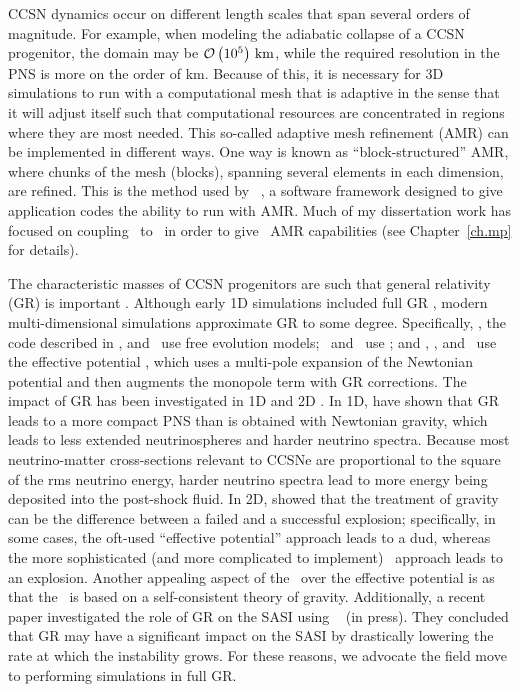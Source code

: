 CCSN dynamics occur on different
length scales that span several orders of magnitude.
For example, when modeling the adiabatic collapse of a CCSN progenitor,
the domain may be $\mathcal{O}\left(10^{5}\right)\,\mathrm{km}$,
while the required resolution in the PNS is more on the order of km.
Because of this, it is necessary for 3D simulations to run with a computational
mesh that is adaptive in the sense that it will adjust itself such that
computational resources are concentrated in regions where they are most needed.
This so-called adaptive mesh refinement (AMR) can be implemented in different
ways.
One way is known as ``block-structured'' AMR,
where chunks of the mesh (blocks), spanning
several elements in each dimension, are refined.
This is the method used by \amrex\ \citep{zab2019}, a software framework designed to give
application codes the ability to run with AMR.
Much of my dissertation work has focused on coupling \thornado\ to \amrex\ in
order to give \thornado\ AMR capabilities (see Chapter~\ref{ch.mp} for details).

The characteristic masses of CCSN progenitors are such that general relativity
(GR) is important \citep[e.g., see][]{lmt2001}.
Although early 1D simulations included full GR
\citep[e.g.,][]{mw1966}, modern multi-dimensional simulations approximate
GR to some degree.
Specifically, \zelmani, the code described in
\citet{ktk2016}, and \nadafld\ use free evolution models;
\cocov\ and \gmunu\ use \xcfc;
and \fornax, \chimera, and \flashx\ use the effective potential \citep{mdj2006},
which uses a multi-pole expansion of the Newtonian potential and then augments
the monopole term with GR corrections.
The impact of GR has been investigated in 1D \citep{bdm2001,lmm2012}
and 2D \citep{mjm2012,oc2018}.
In 1D, \citet{bdm2001} have shown that GR leads to a more compact PNS than is
obtained with Newtonian gravity, which leads to less extended neutrinospheres
and harder neutrino spectra.
Because most neutrino-matter cross-sections relevant to CCSNe are proportional to
the square of the rms neutrino energy, harder neutrino spectra lead to more
energy being deposited into the post-shock fluid.
In 2D, \citet{mjm2012} showed that the treatment of gravity
can be the difference between a failed and a successful explosion;
specifically, in some cases, the oft-used
``effective potential'' approach \citep{mdj2006} leads to a dud, whereas
the more sophisticated (and more complicated to implement) \xcfc\ approach
leads to an explosion.
Another appealing aspect of the \xcfc\ over the effective potential
is as that the \xcfc\ is based on a self-consistent theory of gravity.
Additionally, a recent paper investigated the role of GR on the SASI
using \thornado\ \citep{dem2023} (in press).
They concluded that GR may have a significant impact on the SASI by drastically
lowering the rate at which the instability grows.
For these reasons, we advocate the field move to performing simulations
in full GR.


